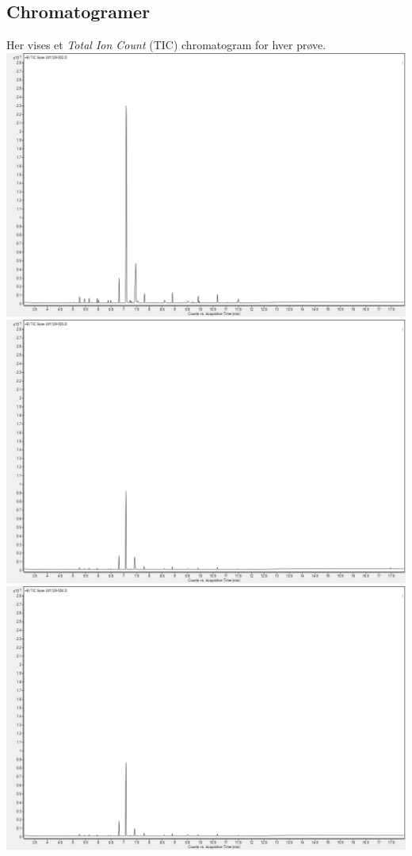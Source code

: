\subsection{Chromatogramer}\label{appsec:chrom}
Her vises et \emph{Total Ion Count} (TIC) chromatogram for hver prøve.\newpage
\includegraphics[width=1\linewidth]{graphics/data/GC/241129-002.png}
\includegraphics[width=1\linewidth]{graphics/data/GC/241129-003.png}
\includegraphics[width=1\linewidth]{graphics/data/GC/241129-004.png}
